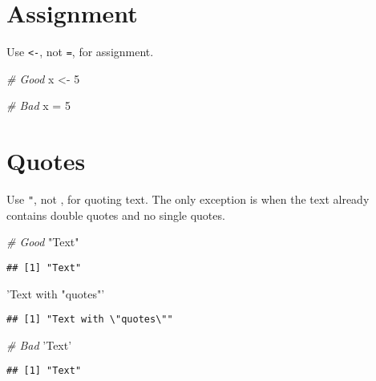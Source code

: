 \documentclass[]{book}
\newenvironment{Shaded}{\begin{snugshade}}{\end{snugshade}}
\newcommand{\DecValTok}[1]{\textcolor[rgb]{0.00,0.00,0.81}{{#1}}}
\newcommand{\StringTok}[1]{\textcolor[rgb]{0.31,0.60,0.02}{{#1}}}
\newcommand{\CommentTok}[1]{\textcolor[rgb]{0.56,0.35,0.01}{\textit{{#1}}}}
\newcommand{\NormalTok}[1]{{#1}}
\begin{document}
\section{Assignment}\label{assignment}

Use \texttt{\textless{}-}, not \texttt{=}, for assignment.

\begin{Shaded}
\begin{Highlighting}[]
\CommentTok{# Good}
\NormalTok{x <-}\StringTok{ }\DecValTok{5}

\CommentTok{# Bad}
\NormalTok{x =}\StringTok{ }\DecValTok{5}
\end{Highlighting}
\end{Shaded}

\section{Quotes}\label{quotes}

Use \texttt{"}, not \texttt{\textquotesingle{}}, for quoting text. The
only exception is when the text already contains double quotes and no
single quotes.

\begin{Shaded}
\begin{Highlighting}[]
\CommentTok{# Good}
\StringTok{"Text"}
\end{Highlighting}
\end{Shaded}

\begin{verbatim}
## [1] "Text"
\end{verbatim}

\begin{Shaded}
\begin{Highlighting}[]
\StringTok{'Text with "quotes"'}
\end{Highlighting}
\end{Shaded}

\begin{verbatim}
## [1] "Text with \"quotes\""
\end{verbatim}

\begin{Shaded}
\begin{Highlighting}[]
\CommentTok{# Bad}
\StringTok{'Text'}
\end{Highlighting}
\end{Shaded}

\begin{verbatim}
## [1] "Text"
\end{verbatim}
\end{document}

